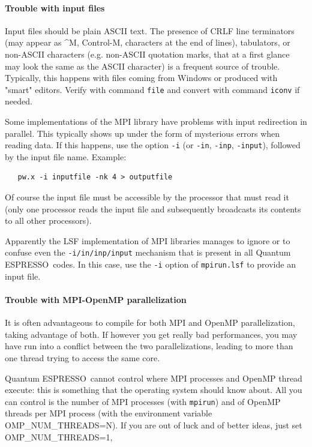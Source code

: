 \documentclass[12pt,a4paper]{article}
\def\qe{{\sc Quantum ESPRESSO}}
\begin{document}
\paragraph{Trouble with input files}
Input files should be plain ASCII text. The presence of CRLF line 
terminators (may appear as \^{}M, Control-M, characters at the end
of lines), tabulators, or non-ASCII characters (e.g. non-ASCII
quotation marks, that at a first glance may look the same as
the ASCII character) is a frequent source of trouble.
Typically, this happens with files coming from Windows or produced
with "smart" editors. Verify with command \texttt{file} and convert
with command \texttt{iconv} if needed.

Some implementations of the MPI library have problems with input
redirection in parallel. This typically shows up under the form of
mysterious errors when reading data. If this happens, use the option
\texttt{-i} (or \texttt{-in}, \texttt{-inp}, \texttt{-input}),
followed by the input file name.
Example:
\begin{verbatim}
   pw.x -i inputfile -nk 4 > outputfile
\end{verbatim}
Of course the
input file must be accessible by the processor that must read it
(only one processor reads the input file and subsequently broadcasts
its contents to all other processors).

Apparently the LSF implementation of MPI libraries manages to ignore or to
confuse even the \texttt{-i/in/inp/input} mechanism that is present in all
\qe\ codes. In this case, use the \texttt{-i} option of \texttt{mpirun.lsf}
to provide an input file.

\paragraph{Trouble with MPI-OpenMP parallelization}
It is often advantageous to compile for both MPI and OpenMP parallelization,
taking advantage of both. If however you get really bad performances, you 
may have run into a conflict between the two parallelizations, leading to
more than one thread trying to access the same core.

\qe\ cannot control where MPI processes and OpenMP thread execute:
this is something that the operating system should know about. 
All you can control is the number of MPI processes (with \texttt{mpirun})
and of OpenMP threads per MPI process (with the environment variable
OMP\_NUM\_THREADS=N). If you are out of luck and of better ideas, just set
OMP\_NUM\_THREADS=1,
\end{document}
